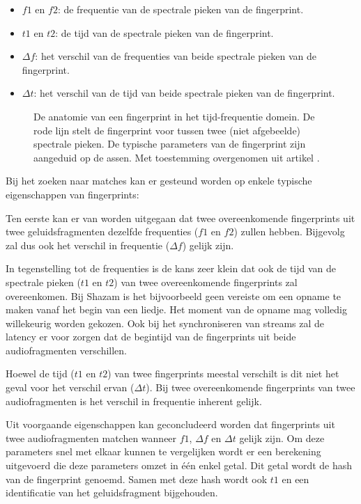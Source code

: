 \begin{itemize}[noitemsep]
	\item $ f1 $ en $ f2 $: de frequentie van de spectrale pieken van de fingerprint.
	\item $ t1 $ en $ t2 $: de tijd van de spectrale pieken van de fingerprint.
	\item $ \Delta f $: het verschil van de frequenties van beide spectrale pieken van de fingerprint.
	\item $ \Delta t $: het verschil van de tijd van beide spectrale pieken van de fingerprint.
\end{itemize}

\begin{figure}[h]
	\captionsetup{width=0.7\textwidth}
	\caption[De anatomie van een fingerprint]{De anatomie van een fingerprint in het tijd-frequentie domein. De rode lijn stelt de fingerprint voor tussen twee (niet afgebeelde) spectrale pieken. De typische parameters van de fingerprint zijn aangeduid op de assen. Met toestemming overgenomen uit artikel \cite{six2015multimodal}.}
	\begin{center}
		\advance\parskip0.3cm
		
	\end{center}
\end{figure}

Bij het zoeken naar matches kan er gesteund worden op enkele typische eigenschappen van fingerprints: 

Ten eerste kan er van worden uitgegaan dat twee overeenkomende fingerprints uit twee geluidsfragmenten dezelfde frequenties  ($f1$ en $f2$) zullen hebben. Bijgevolg zal dus ook het verschil in frequentie ($\Delta f$) gelijk zijn. 

In tegenstelling tot de frequenties is de kans zeer klein dat ook de tijd van de spectrale pieken ($t1$ en $t2$) van twee overeenkomende fingerprints zal overeenkomen. Bij Shazam is het bijvoorbeeld geen vereiste om een opname te maken vanaf het begin van een liedje. Het moment van de opname mag volledig willekeurig worden gekozen. Ook bij het synchroniseren van streams zal de latency er voor zorgen dat de begintijd van de fingerprints uit beide audiofragmenten verschillen.

Hoewel de tijd ($t1$ en $t2$) van twee fingerprints meestal verschilt is dit niet het geval voor het verschil ervan ($\Delta t$). Bij twee overeenkomende fingerprints van twee audiofragmenten is het verschil in frequentie inherent gelijk.

Uit voorgaande eigenschappen kan geconcludeerd worden dat fingerprints uit twee audiofragmenten matchen wanneer $ f1 $, $ \Delta f $ en $ \Delta t $ gelijk zijn. Om deze parameters snel met elkaar kunnen te vergelijken wordt er een berekening uitgevoerd die deze parameters omzet in één enkel getal. Dit getal wordt de hash van de fingerprint genoemd. Samen met deze hash wordt ook $ t1 $ en een identificatie van het geluidsfragment bijgehouden.


